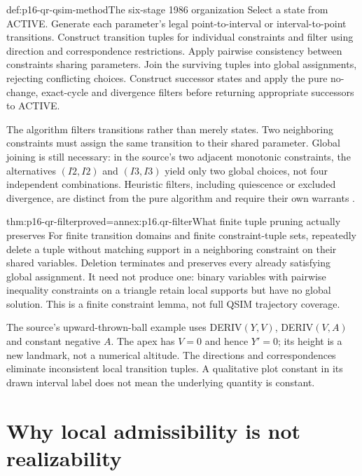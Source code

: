 \begin{hbmethod}{def:p16-qr-qsim-method}{The six-stage 1986 organization}
Select a state from ACTIVE. Generate each parameter's legal point-to-interval
or interval-to-point transitions. Construct transition tuples for individual
constraints and filter using direction and correspondence restrictions.
Apply pairwise consistency between constraints sharing parameters. Join
the surviving tuples into global assignments, rejecting conflicting choices.
Construct successor states and apply the pure no-change, exact-cycle and
divergence filters before returning appropriate successors to ACTIVE.
\end{hbmethod}

The algorithm filters transitions rather than merely states. Two neighboring
constraints must assign the same transition to their shared parameter.
Global joining is still necessary: in the source's two adjacent monotonic
constraints, the alternatives \((I2,I2)\) and \((I3,I3)\) yield only
two global choices, not four independent combinations. Heuristic filters,
including quiescence or excluded divergence, are distinct from the pure
algorithm and require their own warrants
\cite[secs.~4.5--4.9]{Kuipers1986QualitativeSimulation}.

\begin{hbtheorem}{thm:p16-qr-filter}{proved=annex:p16.qr-filter}{What finite tuple pruning actually preserves}
For finite transition domains and finite constraint-tuple sets, repeatedly
delete a tuple without matching support in a neighboring constraint on their
shared variables. Deletion terminates and preserves every already satisfying
global assignment. It need not produce one: binary variables with pairwise
inequality constraints on a triangle retain local supports but have no global
solution. This is a finite constraint lemma, not full QSIM trajectory coverage.
\end{hbtheorem}

The source's upward-thrown-ball example uses DERIV\((Y,V)\),
DERIV\((V,A)\) and constant negative \(A\). The apex has \(V=0\)
and hence \(Y'=0\); its height is a new landmark, not a numerical altitude.
The directions and correspondences eliminate inconsistent local transition
tuples. A qualitative plot constant in its drawn interval label does not mean
the underlying quantity is constant.

\section{Why local admissibility is not realizability}
\label{sec:p16-qr-spurious}

